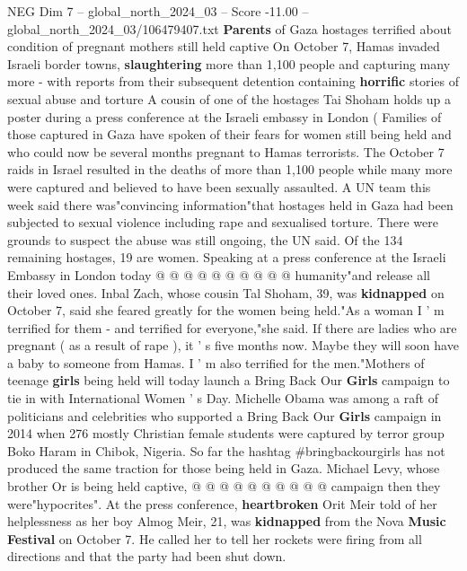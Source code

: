\begin{textsample}{NEG Dim 7 – global\_north\_2024\_03 – Score -11.00 – global\_north\_2024\_03/106479407.txt}  \label{ex:f7_neg_231}
\textbf{Parents} of Gaza hostages terrified about condition of pregnant mothers still held captive On October 7, Hamas invaded Israeli border towns, \textbf{slaughtering} more than 1,100 people and capturing many more - with reports from their subsequent detention containing \textbf{horrific} stories of sexual abuse and torture A cousin of one of the hostages Tai Shoham holds up a poster during a press conference at the Israeli embassy in London ( Families of those captured in Gaza have spoken of their fears for women still being held and who could now be several months pregnant to Hamas terrorists.
The October 7 raids in Israel resulted in the deaths of more than 1,100 people while many more were captured and believed to have been sexually assaulted.
A UN team this week said there was"convincing information"that hostages held in Gaza had been subjected to sexual violence including rape and sexualised torture.
There were grounds to suspect the abuse was still ongoing, the UN said.
Of the 134 remaining hostages, 19 are women.
Speaking at a press conference at the Israeli Embassy in London today @ @ @ @ @ @ @ @ @ @ humanity"and release all their loved ones.
Inbal Zach, whose cousin Tal Shoham, 39, was \textbf{kidnapped} on October 7, said she feared greatly for the women being held."As a woman I ' m terrified for them - and terrified for everyone,"she said.
If there are ladies who are pregnant ( as a result of rape ), it ' s five months now.
Maybe they will soon have a baby to someone from Hamas.
I ' m also terrified for the men."Mothers of teenage \textbf{girls} being held will today launch a Bring Back Our \textbf{Girls} campaign to tie in with International Women ' s Day.
Michelle Obama was among a raft of politicians and celebrities who supported a Bring Back Our \textbf{Girls} campaign in 2014 when 276 mostly Christian female students were captured by terror group Boko Haram in Chibok, Nigeria.
So far the hashtag \#bringbackourgirls has not produced the same traction for those being held in Gaza.
Michael Levy, whose brother Or is being held captive, @ @ @ @ @ @ @ @ @ @ campaign then they were"hypocrites".
At the press conference, \textbf{heartbroken} Orit Meir told of her helplessness as her boy Almog Meir, 21, was \textbf{kidnapped} from the Nova \textbf{Music} \textbf{Festival} on October 7.
He called her to tell her rockets were firing from all directions and that the party had been shut down.

\end{textsample}
